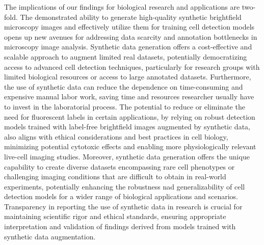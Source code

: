 The implications of our findings for biological research and applications are two-fold.
The demonstrated ability to generate high-quality synthetic brightfield microscopy images and effectively utilize them for training cell detection  models opens up new avenues for addressing data scarcity and annotation bottlenecks in microscopy image analysis.
Synthetic data generation offers a cost-effective and scalable approach to augment limited real datasets, potentially democratizing access to advanced cell detection techniques, particularly for research groups with limited biological resources or access to large annotated datasets.
Furthermore, the use of synthetic data can reduce the dependence on time-consuming and expensive manual labor work, saving time and resources researcher usually have to invest in the laboratorial process.
The potential to reduce or eliminate the need for fluorescent labels in certain applications, by relying on robust detection models trained with label-free brightfield images augmented by synthetic data, also aligns with ethical considerations and best practices in cell biology, minimizing potential cytotoxic effects and enabling more physiologically relevant live-cell imaging studies.
Moreover, synthetic data generation offers the unique capability to create diverse datasets encompassing rare cell phenotypes or challenging imaging conditions that are difficult to obtain in real-world experiments, potentially enhancing the robustness nad generalizability of cell detection models for a wider range of biological applications and scenarios.
Transparency in reporting the use of synthetic data in research is crucial for maintaining scientific rigor and ethical standards, ensuring appropriate interpretation and validation of findings derived from models trained with synthetic data augmentation.